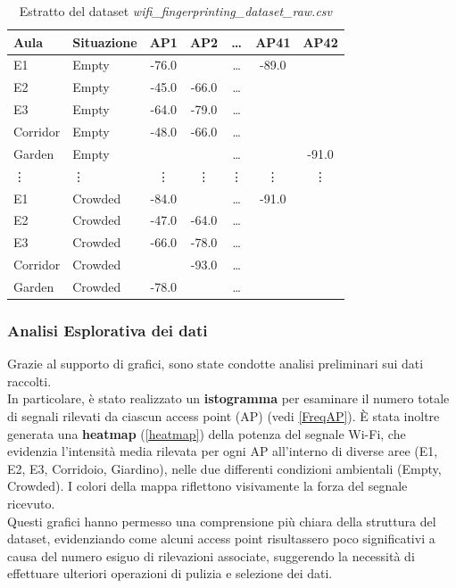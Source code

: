 \documentclass{article}
\begin{document}
\begin{table}[ht!]
    \centering
    \small
    \begin{tabular}{llc c c cc}
        \toprule
        Aula & Situazione & AP1 & AP2 & \dots & AP41 & AP42 \\
        \midrule
        E1 & Empty & -76.0 &  & \dots & -89.0 & \\

        E2 & Empty & -45.0 & -66.0  & \dots &  & \\
        E3 & Empty & -64.0 & -79.0 & \dots &  &  \\     
        Corridor & Empty & -48.0 & -66.0  & \dots &  & \\
        Garden & Empty &  &   & \dots &  & -91.0 \\
         \vdots & \vdots & \vdots & \vdots & \vdots & \vdots & \vdots \\
        E1 & Crowded & -84.0 &  & \dots & -91.0 &  \\
        E2 & Crowded & -47.0 & -64.0  & \dots &  & \\   
        E3 & Crowded & -66.0 & -78.0 & \dots &  &  \\
        Corridor & Crowded &  & -93.0  & \dots &  & \\
        Garden & Crowded & -78.0 &   & \dots &  & \\

        \bottomrule
    \end{tabular}
    \caption{Estratto del dataset \textit{wifi\_fingerprinting\_dataset\_raw.csv} }
    \label{tab:wifi_data}
\end{table}

\subsubsection{Analisi Esplorativa dei dati}
Grazie al supporto di grafici, sono state condotte analisi preliminari sui dati raccolti.\\
In particolare, è stato realizzato un \textbf{istogramma} per esaminare il numero totale di segnali rilevati da ciascun access point (AP) (vedi \autoref{FreqAP}).
È stata inoltre generata una \textbf{heatmap} (\autoref{heatmap}) della potenza del segnale Wi-Fi, che evidenzia l'intensità media rilevata per ogni AP all'interno di diverse aree (E1, E2, E3, Corridoio, Giardino), nelle due differenti condizioni ambientali (Empty, Crowded). I colori della mappa riflettono visivamente la forza del segnale ricevuto.\\
Questi grafici hanno permesso una comprensione più chiara della struttura del dataset, evidenziando come alcuni access point risultassero poco significativi a causa del numero esiguo di rilevazioni associate, suggerendo la necessità di effettuare ulteriori operazioni di pulizia e selezione dei dati.
\end{document}
